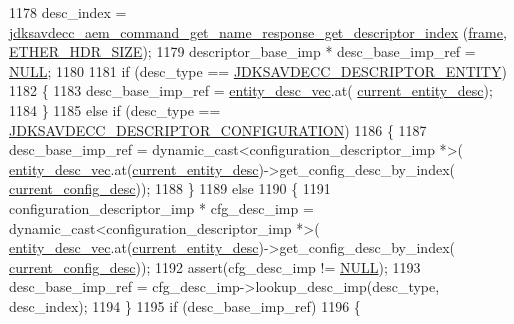 \begin{DoxyCode}
{{1178         desc\_index = 
      \hyperlink{group__command__get__name__response_gace444f9fe92f80bf52c6d3d9199e7b38}{jdksavdecc\_aem\_command\_get\_name\_response\_get\_descriptor\_index}
      (\hyperlink{gst__avb__playbin_8c_ac8e710e0b5e994c0545d75d69868c6f0}{frame}, \hyperlink{namespaceavdecc__lib_a6c827b1a0d973e18119c5e3da518e65ca9512ad9b34302ba7048d88197e0a2dc0}{ETHER\_HDR\_SIZE});
1179         descriptor\_base\_imp * desc\_base\_imp\_ref = \hyperlink{openavb__types__base__pub_8h_a070d2ce7b6bb7e5c05602aa8c308d0c4}{NULL};
1180 
1181         \textcolor{keywordflow}{if} (desc\_type == \hyperlink{group__descriptor_gaf06b7a0bf808dc8e3104511947d694c4}{JDKSAVDECC\_DESCRIPTOR\_ENTITY})
1182         \{
1183             desc\_base\_imp\_ref = \hyperlink{classavdecc__lib_1_1end__station__imp_a72edab41bc56e3c1757944a7df188a3d}{entity\_desc\_vec}.at(
      \hyperlink{classavdecc__lib_1_1end__station__imp_afd78c89df26ba7641e1adb764c0e827d}{current\_entity\_desc});
1184         \}
1185         \textcolor{keywordflow}{else} \textcolor{keywordflow}{if} (desc\_type == \hyperlink{group__descriptor_ga645687847f92dc28bcb37a7c334cb875}{JDKSAVDECC\_DESCRIPTOR\_CONFIGURATION})
1186         \{
1187             desc\_base\_imp\_ref = \textcolor{keyword}{dynamic\_cast<}configuration\_descriptor\_imp *\textcolor{keyword}{>}(
      \hyperlink{classavdecc__lib_1_1end__station__imp_a72edab41bc56e3c1757944a7df188a3d}{entity\_desc\_vec}.at(\hyperlink{classavdecc__lib_1_1end__station__imp_afd78c89df26ba7641e1adb764c0e827d}{current\_entity\_desc})->get\_config\_desc\_by\_index(
      \hyperlink{classavdecc__lib_1_1end__station__imp_a60b1af40d35e8a86b0082c54ab6cb6a8}{current\_config\_desc}));
1188         \}
1189         \textcolor{keywordflow}{else}
1190         \{
1191             configuration\_descriptor\_imp * cfg\_desc\_imp = \textcolor{keyword}{dynamic\_cast<}configuration\_descriptor\_imp *\textcolor{keyword}{>}(
      \hyperlink{classavdecc__lib_1_1end__station__imp_a72edab41bc56e3c1757944a7df188a3d}{entity\_desc\_vec}.at(\hyperlink{classavdecc__lib_1_1end__station__imp_afd78c89df26ba7641e1adb764c0e827d}{current\_entity\_desc})->get\_config\_desc\_by\_index(
      \hyperlink{classavdecc__lib_1_1end__station__imp_a60b1af40d35e8a86b0082c54ab6cb6a8}{current\_config\_desc}));
1192             assert(cfg\_desc\_imp != \hyperlink{openavb__types__base__pub_8h_a070d2ce7b6bb7e5c05602aa8c308d0c4}{NULL});
1193             desc\_base\_imp\_ref = cfg\_desc\_imp->lookup\_desc\_imp(desc\_type, desc\_index);
1194         \}
1195         \textcolor{keywordflow}{if} (desc\_base\_imp\_ref)
1196         \{
}}
\end{DoxyCode}
